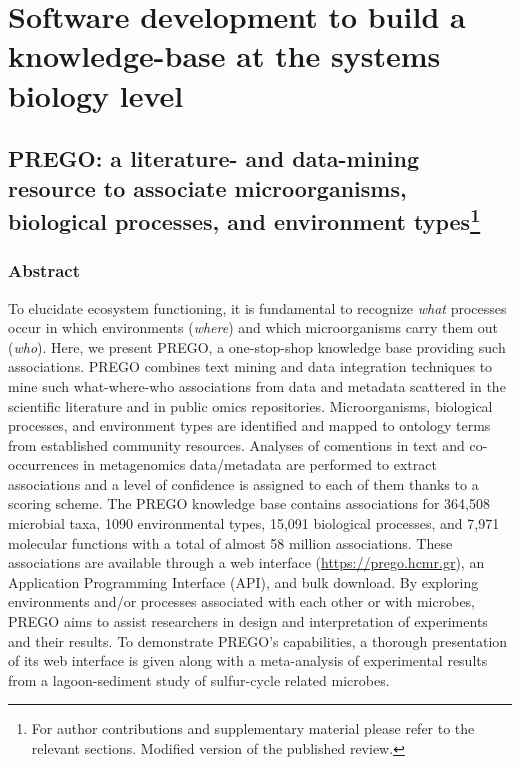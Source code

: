 % 
% 


\chapter{Software development to build a knowledge-base at the systems biology level}
\label{cha:prego}



\section[PREGO: a literature- and data-mining resource to associate microorganisms, biological processes, and environment types]{PREGO: a literature- and data-mining resource to associate microorganisms, biological processes, and environment types\footnote{
   For author contributions and supplementary material please refer to the relevant sections. 
   Modified version of the published review.
   }
}

\subsection{Abstract}

   To elucidate ecosystem functioning, it is fundamental to recognize \textit{what} processes occur in which environments (\textit{where}) and which microorganisms carry them out (\textit{who}). 
   Here, we present PREGO, a one-stop-shop knowledge base providing such associations. 
   PREGO combines text mining and data integration techniques to mine such what-where-who associations from data and metadata scattered in the scientific literature and in public omics repositories. 
   Microorganisms, biological processes, and environment types are identified and mapped to ontology terms from established community resources. 
   Analyses of comentions in text and co-occurrences in metagenomics data/metadata are performed to extract associations and a level of confidence is assigned to each of them thanks to a scoring scheme. 
   The PREGO knowledge base contains associations for 364,508 microbial taxa, 1090 environmental types, 15,091 biological processes, and 7,971 molecular functions with a total of almost 58 million associations. 
   These associations are available through a web interface (\href{https://prego.hcmr.gr}{https://prego.hcmr.gr}), an Application Programming Interface (API), and bulk download. 
   By exploring environments and/or processes associated with each other or with microbes, PREGO aims to assist researchers in design and interpretation of experiments and their results. 
   To demonstrate PREGO's capabilities, a thorough presentation of its web interface is given along with a meta-analysis of experimental results from a lagoon-sediment study of sulfur-cycle related microbes.

